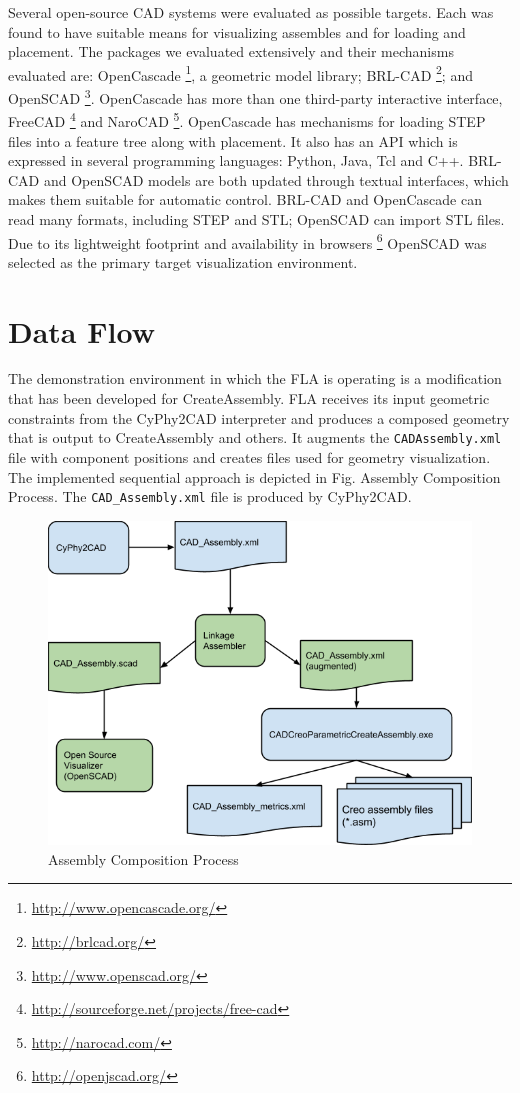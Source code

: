 \documentclass[]{report}
\begin{document}
Several open-source CAD systems were evaluated as possible targets.  
Each was found to have suitable means for visualizing assembles and for loading and placement. 
The packages we evaluated extensively and their mechanisms evaluated are: 
OpenCascade \footnote{\url{http://www.opencascade.org/}}, a geometric model library; 
BRL-CAD \footnote{\url{http://brlcad.org/}}; and 
OpenSCAD \footnote{\url{http://www.openscad.org/}}. 
OpenCascade has more than one third-party interactive interface, 
FreeCAD \footnote{\url{http://sourceforge.net/projects/free-cad}} and
NaroCAD \footnote{\url{http://narocad.com/}}. 
OpenCascade has mechanisms for loading STEP files into a feature tree along with placement. 
It also has an API which is expressed in several programming languages: 
Python, Java, Tcl and C++. BRL-CAD and OpenSCAD models are both updated 
through textual interfaces, which makes them suitable for automatic control.  
BRL-CAD and OpenCascade can read many formats, including STEP and STL; 
OpenSCAD can import STL files.  
Due to its lightweight footprint and availability in browsers 
\footnote{\url{http://openjscad.org/}}
OpenSCAD was selected as the primary target visualization environment.

\section{Data Flow}

The demonstration environment in which the FLA is operating is 
a modification that has been developed for CreateAssembly. 
FLA receives its input geometric constraints from the CyPhy2CAD 
interpreter and produces a composed geometry that is output to CreateAssembly and others.  
It augments the \texttt{CADAssembly.xml} file with component positions 
and creates files used for geometry visualization. 
The implemented sequential approach is depicted in Fig. Assembly Composition Process. 
The \texttt{CAD\_Assembly.xml} file is produced by CyPhy2CAD.  

\begin{figure}[h!]
	\centering
	\includegraphics[scale=0.7]{images/image13}
	\caption{Assembly Composition Process}
	\label{fig:assy-compose}
\end{figure}
\end{document}
